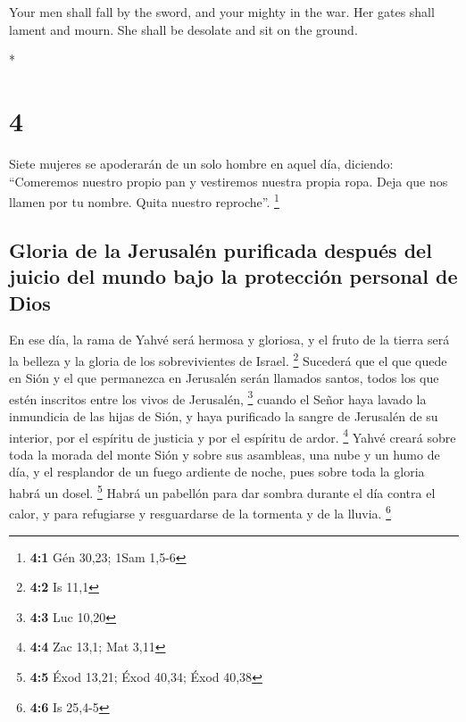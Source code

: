 \begin{paracol}{2}
\begin{otherlanguage}{english}
 Your men shall fall by the sword, and your mighty in the
war.  Her gates shall lament and mourn. She shall be
desolate and sit on the ground.

\end{otherlanguage}

\switchcolumn[0]*

\hypertarget{section-6}{%
\section{4}\label{section-6}}

 Siete mujeres se apoderarán de un solo hombre en aquel
día, diciendo: ``Comeremos nuestro propio pan y vestiremos nuestra
propia ropa. Deja que nos llamen por tu nombre. Quita nuestro
reproche''. \footnote{\textbf{4:1} Gén 30,23; 1Sam 1,5-6}

\hypertarget{gloria-de-la-jerusaluxe9n-purificada-despuuxe9s-del-juicio-del-mundo-bajo-la-protecciuxf3n-personal-de-dios}{%
\subsection{Gloria de la Jerusalén purificada después del juicio del
mundo bajo la protección personal de
Dios}\label{gloria-de-la-jerusaluxe9n-purificada-despuuxe9s-del-juicio-del-mundo-bajo-la-protecciuxf3n-personal-de-dios}}

 En ese día, la rama de Yahvé será hermosa y gloriosa, y
el fruto de la tierra será la belleza y la gloria de los sobrevivientes
de Israel. \footnote{\textbf{4:2} Is 11,1}  Sucederá que
el que quede en Sión y el que permanezca en Jerusalén serán llamados
santos, todos los que estén inscritos entre los vivos de Jerusalén,
\footnote{\textbf{4:3} Luc 10,20}  cuando el Señor haya
lavado la inmundicia de las hijas de Sión, y haya purificado la sangre
de Jerusalén de su interior, por el espíritu de justicia y por el
espíritu de ardor. \footnote{\textbf{4:4} Zac 13,1; Mat 3,11}
 Yahvé creará sobre toda la morada del monte Sión y sobre
sus asambleas, una nube y un humo de día, y el resplandor de un fuego
ardiente de noche, pues sobre toda la gloria habrá un dosel. \footnote{\textbf{4:5}
  Éxod 13,21; Éxod 40,34; Éxod 40,38}  Habrá un pabellón
para dar sombra durante el día contra el calor, y para refugiarse y
resguardarse de la tormenta y de la lluvia. \footnote{\textbf{4:6} Is
  25,4-5}

\switchcolumn
\begin{otherlanguage}{english}


\end{otherlanguage}
\end{paracol}
